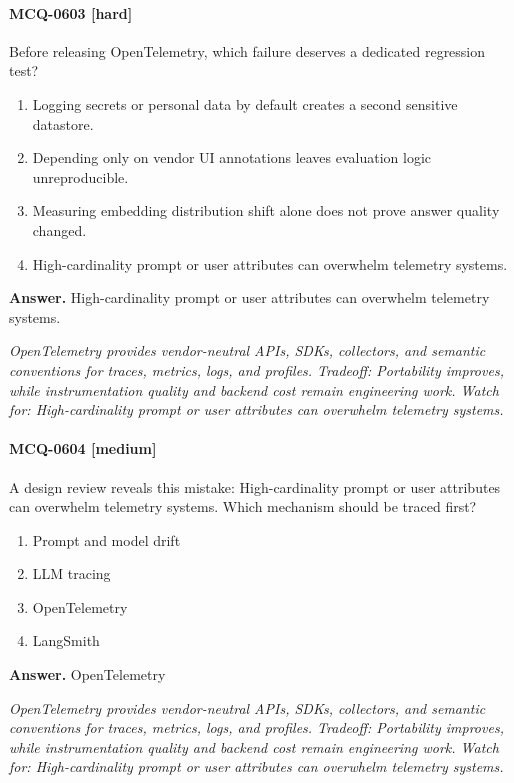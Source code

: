 \paragraph{MCQ-0603 [hard]} Before releasing OpenTelemetry, which failure deserves a dedicated regression test?
\begin{enumerate}[label=\Alph*.]
\item Logging secrets or personal data by default creates a second sensitive datastore.
\item Depending only on vendor UI annotations leaves evaluation logic unreproducible.
\item Measuring embedding distribution shift alone does not prove answer quality changed.
\item High-cardinality prompt or user attributes can overwhelm telemetry systems.
\end{enumerate}
\noindent\textbf{Answer.} High-cardinality prompt or user attributes can overwhelm telemetry systems.
\par\textit{OpenTelemetry provides vendor-neutral APIs, SDKs, collectors, and semantic conventions for traces, metrics, logs, and profiles. Tradeoff: Portability improves, while instrumentation quality and backend cost remain engineering work. Watch for: High-cardinality prompt or user attributes can overwhelm telemetry systems.}
\paragraph{MCQ-0604 [medium]} A design review reveals this mistake: High-cardinality prompt or user attributes can overwhelm telemetry systems. Which mechanism should be traced first?
\begin{enumerate}[label=\Alph*.]
\item Prompt and model drift
\item LLM tracing
\item OpenTelemetry
\item LangSmith
\end{enumerate}
\noindent\textbf{Answer.} OpenTelemetry
\par\textit{OpenTelemetry provides vendor-neutral APIs, SDKs, collectors, and semantic conventions for traces, metrics, logs, and profiles. Tradeoff: Portability improves, while instrumentation quality and backend cost remain engineering work. Watch for: High-cardinality prompt or user attributes can overwhelm telemetry systems.}

